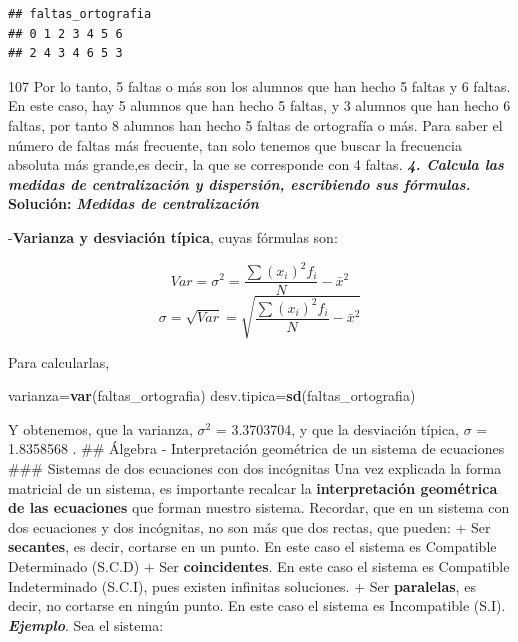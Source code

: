 \documentclass[12pt,]{krantz}
\newenvironment{Shaded}{\begin{snugshade}}{\end{snugshade}}
\newcommand{\KeywordTok}[1]{\textcolor[rgb]{0.27,0.27,0.27}{\textbf{#1}}}
\newcommand{\NormalTok}[1]{#1}
\theoremstyle{definition}
\theoremstyle{definition}
\theoremstyle{definition}
\theoremstyle{remark}
\begin{document}
\begin{verbatim}
## faltas_ortografia
## 0 1 2 3 4 5 6 
## 2 4 3 4 6 5 3
\end{verbatim}

107
Por lo tanto, 5 faltas o más son los alumnos que han hecho 5 faltas y 6 faltas. En este caso, hay 5
alumnos que han hecho 5 faltas, y 3 alumnos que han hecho 6 faltas, por tanto 8 alumnos
han hecho 5 faltas de ortografía o más.
Para saber el número de faltas más frecuente, tan solo tenemos que buscar la frecuencia
absoluta más grande,es decir, la que se corresponde con 4 faltas.
\textbf{\emph{4. Calcula las medidas de centralización y dispersión, escribiendo sus fórmulas.}}
\textbf{Solución:}
\textbf{\emph{Medidas de centralización}}

-\textbf{Varianza y desviación típica}, cuyas fórmulas son:

\[ Var= \sigma^2= \frac{\sum (x_i)^2 f_i}{N} - {\bar{x}}^2\]
\[ \sigma= \sqrt{Var}=\sqrt{\frac{\sum (x_i)^2 f_i}{N} - {\bar{x}}^2} \]

Para calcularlas,

\begin{Shaded}
\begin{Highlighting}[]
\NormalTok{varianza=}\KeywordTok{var}\NormalTok{(faltas_ortografia)}
\NormalTok{desv.tipica=}\KeywordTok{sd}\NormalTok{(faltas_ortografia)}
\end{Highlighting}
\end{Shaded}

Y obtenemos, que la varianza, \(\sigma^2\) = 3.3703704, y que la desviación típica, \(\sigma\) =
1.8358568 .
\#\# Álgebra - Interpretación geométrica de un sistema de ecuaciones
\#\#\# Sistemas de dos ecuaciones con dos incógnitas
Una vez explicada la forma matricial de un sistema, es importante recalcar la \textbf{interpretación
geométrica de las ecuaciones} que forman nuestro sistema. Recordar, que en un sistema con
dos ecuaciones y dos incógnitas, no son más que dos rectas, que pueden:
+ Ser \textbf{secantes}, es decir, cortarse en un punto. En este caso el sistema es Compatible
Determinado (S.C.D)
+ Ser \textbf{coincidentes}. En este caso el sistema es Compatible Indeterminado (S.C.I), pues
existen infinitas soluciones.
+ Ser \textbf{paralelas}, es decir, no cortarse en ningún punto. En este caso el sistema es
Incompatible (S.I).
\textbf{\emph{Ejemplo}}. Sea el sistema:
\end{document}
